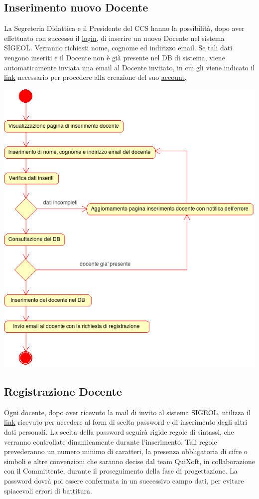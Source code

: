 \documentclass[11pt,a4paper]{article}
\begin{document}
\subsection{Inserimento nuovo Docente}
La Segreteria Didattica e il Presidente del CCS hanno la possibilità, dopo aver effettuato con successo il \underline{login}, di inserire un nuovo Docente nel sistema SIGEOL. Verranno richiesti nome, cognome ed indirizzo email. Se tali dati vengono inseriti e il Docente non è già presente nel DB di sistema, viene automaticamente inviata una email al Docente invitato, in cui gli viene indicato il \underline{link} necessario per procedere alla creazione del suo \underline{account}.
\begin{center}
 \includegraphics[scale=0.9]{images/inserimento_docente.png}
\end{center}

\newpage
\subsection{Registrazione Docente}
Ogni docente, dopo aver ricevuto la mail di invito al sistema SIGEOL, utilizza il \underline{link} ricevuto per accedere al form di scelta password e di inserimento degli altri dati personali. La scelta della password seguirà rigide regole di sintassi, che verranno controllate dinamicamente durante l'inserimento. Tali regole prevederanno un numero minimo di caratteri, la presenza obbligatoria di cifre o simboli e altre convenzioni che saranno decise dal team QuiXoft, in collaborazione con il Committente, durante il proseguimento della fase di progettazione. La password dovrà poi essere confermata in un successivo campo dati, per evitare spiacevoli errori di battitura.
\end{document}
